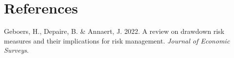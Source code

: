 \documentclass[11pt,preprint, authoryear]{elsarticle}
\numberwithin{equation}{section}
\numberwithin{figure}{section}
\numberwithin{table}{section}
\newlength{\cslhangindent}
\newenvironment{CSLReferences}%
  {\setlength{\parindent}{0pt}%
  \everypar{\setlength{\hangindent}{\cslhangindent}}\ignorespaces}%
  {\par}
\begin{document}
\newpage

\hypertarget{references}{%
\section*{References}\label{references}}

\hypertarget{refs}{}
\begin{CSLReferences}{1}{0}
\leavevmode{}%
Geboers, H., Depaire, B. \& Annaert, J. 2022. A review on drawdown risk
measures and their implications for risk management. \emph{Journal of
Economic Surveys}.

\end{CSLReferences}


\end{document}
